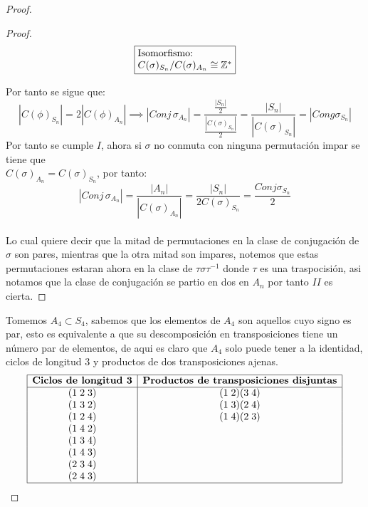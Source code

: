 \documentclass[11pt,letterpaper]{article}
\newcommand{\Z}{\mathbb{Z}}
\begin{document}
\begin{proof}
\begin{proof}
\[\begin{tikzpicture}[node distance=3cm]
  \node[draw, rectangle, xshift=7cm, align=left](iso) 
    {Isomorfismo:\\
     $C(\sigma )_{S_n}/C(\sigma )_{A_n} \cong \Z^{*}$};
\end{tikzpicture}
\]
Por tanto se sigue que:\,\\
\begin{equation*}
    |C(\phi)_{S_n}|=2|C(\phi)_{A_n}|\implies |Conj\,\sigma_{A_n}|=\frac{\frac{|S_n|}{2}}{\frac{|C(\sigma)_{S_n}|}{2}}=\frac{|S_n|}{|C(\sigma)_{S_n}|}=|Cong \sigma_{S_n}|
\end{equation*}
Por tanto se cumple $I$, ahora si $\sigma$ no conmuta con ninguna permutaci\'on impar se tiene que\\ $C(\sigma)_{A_n}=C(\sigma)_{S_n}$, por tanto:
\begin{equation*}
     |Conj\,\sigma_{A_n}|= \frac{|A_n|}{|C(\sigma)_{A_n}|}=\frac{|S_n|}{2C(\sigma)_{S_n}}=\frac{Conj\sigma_{S_n}}{2}
\end{equation*}\,\\
Lo cual quiere decir que la mitad de permutaciones en la clase de conjugaci\'on de $\sigma$ son pares, mientras que la otra mitad son impares, notemos que estas permutaciones estaran ahora en la clase de $\tau \sigma \tau^{-1}$ donde $\tau$ es una traspocisi\'on, asi notamos que la clase de conjugaci\'on se partio en dos en $A_n$ por tanto $II$ es cierta.
\end{proof}
Tomemos $A_4\subset S_4$, sabemos que los elementos de $A_4$ son aquellos cuyo signo es par, esto es equivalente a que su descomposici\'on en transposiciones tiene un n\'umero par de elementos, de aqui es claro
que $A_4$ solo puede tener a la identidad, ciclos de longitud $3$ y productos de dos transposiciones ajenas.
\[
\begin{array}{|c|c|}
\hline
\textbf{Ciclos de longitud 3} & \textbf{Productos de transposiciones disjuntas} \\
\hline
(1\;2\;3) & (1\;2)(3\;4) \\
(1\;3\;2) & (1\;3)(2\;4) \\
(1\;2\;4) & (1\;4)(2\;3) \\
(1\;4\;2) & \\
(1\;3\;4) & \\
(1\;4\;3) & \\
(2\;3\;4) & \\
(2\;4\;3) & \\
\hline
\end{array}
\]


\end{proof}
\end{document}
